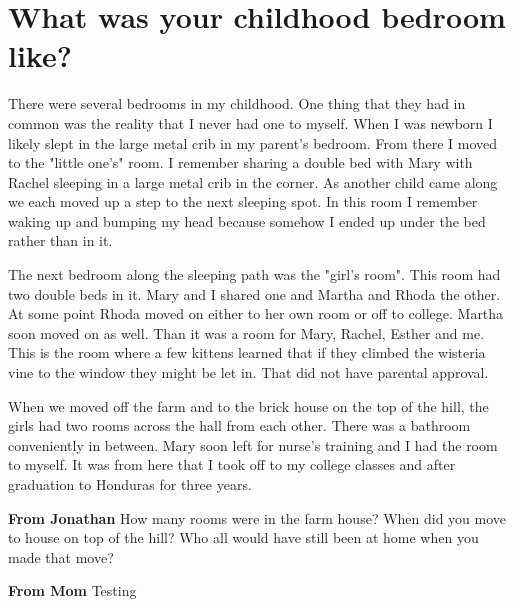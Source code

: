 \section{What was your childhood bedroom like?}
There were several bedrooms in my childhood.
One thing that they had in common was the reality that I never had one to myself.
When I was newborn I likely slept in the large metal crib in my parent's bedroom.
From there I moved to the "little one's" room.
I remember sharing a double bed with Mary with Rachel sleeping in a large metal crib in the corner.
As another child came along we each moved up a step to the next sleeping spot.
In this room I remember waking up and bumping my head because somehow I ended up under the bed rather than in it.

The next bedroom along the sleeping path was the "girl's room".
This room had two double beds in it.
Mary and I shared one and Martha and Rhoda the other.
At some point Rhoda moved on either to her own room or off to college.
Martha soon moved on as well.
Than it was a room for Mary, Rachel, Esther and me.
This is the room where a few kittens learned that if they climbed the wisteria vine to the window they might be let in.
That did not have parental approval.

When we moved off the farm and to the brick house on the top of the hill, the girls had two rooms across the hall from each other.
There was a bathroom conveniently in between.
Mary soon left for nurse's training and I had the room to myself.
It was from here that I took off to my college classes and after graduation to Honduras for three years.


\textbf{From Jonathan} How many rooms were in the farm house?
When did you move to house on top of the hill?  Who all would have still been at home when you made that move?


\textbf{From Mom}
Testing